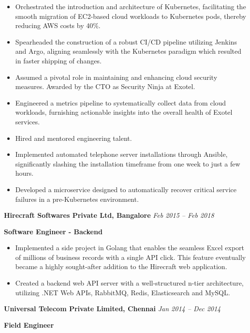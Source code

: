 \documentclass[11pt, oneside]{article}
\begin{document}
\begin{itemize} 
  \item Orchestrated the introduction and architecture of Kubernetes, facilitating the smooth migration of EC2-based cloud workloads to Kubernetes pods, thereby reducing AWS costs by 40\%.
  \item Spearheaded the construction of a robust CI/CD pipeline utilizing Jenkins and Argo, aligning seamlessly with the Kubernetes paradigm which resulted in faster shipping of changes.
  \item Assumed a pivotal role in maintaining and enhancing cloud security measures. Awarded by the CTO as Security Ninja at Exotel.
  \item Engineered a metrics pipeline to systematically collect data from cloud workloads, furnishing actionable insights into the overall health of Exotel services.
  \item Hired and mentored engineering talent.
  \item Implemented automated telephone server installations through Ansible, significantly slashing the installation timeframe from one week to just a few hours.
  \item Developed a microservice designed to automatically recover critical service failures in a pre-Kubernetes environment.

\end{itemize}

\medskip

\textbf{Hirecraft Softwares Private Ltd, Bangalore}
\hfill
\textit{Feb 2015 – Feb 2018}
								 
\textbf{Software Engineer - Backend}

\begin{itemize}
  \item Implemented a side project in Golang that enables the seamless Excel export of millions of business records with a single API click. This feature eventually became a highly sought-after addition to the Hirecraft web application.
  \item Created a backend web API server with a well-structured n-tier architecture, utilizing .NET Web APIs, RabbitMQ, Redis, Elasticsearch and MySQL.

\end{itemize}

\medskip

\textbf{Universal Telecom Private Limited, Chennai}
\hfill
\textit{Jan 2014 – Dec 2014}
								 
\textbf{Field Engineer}
\end{document}
